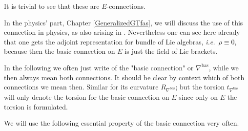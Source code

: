 \begin{remark}
\leavevmode\newline
It is trivial to see that these are $E$-connections.

In the physics' part, Chapter \ref{GeneralizedGTfas}, we will discuss the use of this connection in physics, as also arising in \cite[discussion around Equation (17)]{CurvedYMH}. Nevertheless one can see here already that one gets the adjoint representation for bundle of Lie algebras, \textit{i.e.}~$\rho \equiv 0$, because then the basic connection on $E$ is just the field of Lie brackets.

In the following we often just write of the "basic connection" or $\nabla^{\mathrm{bas}}$, while we then always mean both connections. It should be clear by context which of both connections we mean then. Similar for its curvature $R_{\nabla^\mathrm{bas}}$; but the torsion $t_{\nabla^{\mathrm{bas}}}$ will only denote the torsion for the basic connection on $E$ since only on $E$ the torsion is formulated.
\end{remark}
%
%
%
%
%
We will use the following essential property of the basic connection very often.

